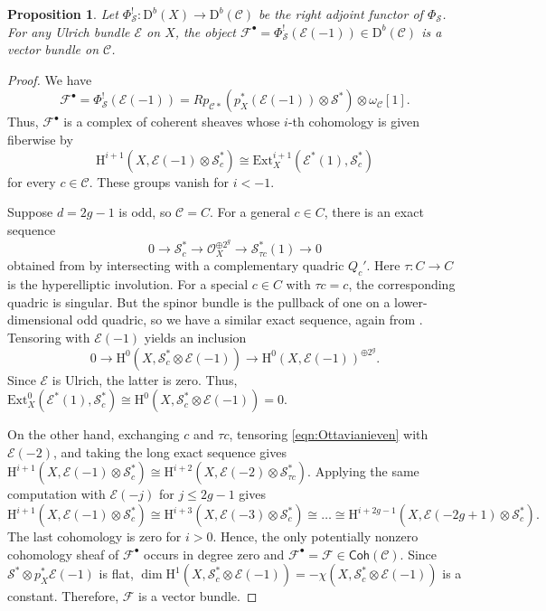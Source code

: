 \documentclass[12pt, letterpaper]{amsart}
\newtheorem{proposition}[theorem]{Proposition}
\theoremstyle{definition}
\newcommand{\cC}{\mathcal{C} }
\newcommand{\cE}{\mathcal{E} }
\newcommand{\cF}{\mathcal{F} }
\newcommand{\cO}{\mathcal{O} }
\newcommand{\cS}{\mathcal{S} }
\newcommand{\rD}{\mathrm{D} }
\newcommand{\rH}{\mathrm{H} }
\def\Ext{\mathrm{Ext} }
\newcommand{\Coh}{\mathsf{Coh}}
\begin{document}
\begin{proposition}\label{prop:FMofUlrichisvb}
Let \(\Phi_{\cS}^! : \rD^b(X) \to \rD^b(\cC)\) be the right adjoint functor of \(\Phi_{\cS}\). For any Ulrich bundle \(\cE\) on \(X\), the object \(\cF^\bullet = \Phi_{\cS}^!(\cE(-1))\in \rD^b(\cC)\) is a vector bundle on \(\cC\).
\end{proposition}

\begin{proof}
We have
\[\cF^\bullet = \Phi_{\cS}^!(\cE(-1)) = Rp_{\cC*}(p_X^*(\cE(-1)) \otimes \cS^*) \otimes \omega_\cC[1].\]
Thus, \(\cF^\bullet\) is a complex of coherent sheaves whose \(i\)-th cohomology is given fiberwise by
\[\rH^{i+1}(X, \cE(-1) \otimes \cS_{c}^*) \cong \Ext_X^{i+1}(\cE^*(1), \cS_{c}^*)\]
for every \(c \in \cC\). These groups vanish for \(i < -1\).

Suppose \(d = 2g - 1\) is odd, so \(\cC = C\). For a general \(c \in C\), there is an exact sequence
\begin{equation}\label{eqn:Ottavianieven}
0 \to \cS_{c}^* \to \cO_{X}^{\oplus 2^g} \to \cS_{\tau c}^*(1) \to 0
\end{equation}
obtained from \cite[Theorem~2.8]{Ott88} by intersecting with a complementary quadric \(Q_c'\). Here \(\tau : C \to C\) is the hyperelliptic involution. For a special \(c \in C\) with \(\tau c = c\), the corresponding quadric is singular. But the spinor bundle is the pullback of one on a lower-dimensional odd quadric, so we have a similar exact sequence, again from \cite[Theorem~2.8]{Ott88}. Tensoring with \(\cE(-1)\) yields an inclusion
\[0 \to \rH^0(X, \cS_c^* \otimes \cE(-1)) \to \rH^0(X, \cE(-1))^{\oplus 2^g}.\]
Since \(\cE\) is Ulrich, the latter is zero. Thus, \(\Ext_X^0(\cE^*(1), \cS_c^*) \cong \rH^0(X, \cS_c^* \otimes \cE(-1)) = 0\).

On the other hand, exchanging \(c\) and \(\tau c\), tensoring \eqref{eqn:Ottavianieven} with \(\cE(-2)\), and taking the long exact sequence gives \(\rH^{i+1}(X, \cE(-1) \otimes \cS_{c}^*) \cong \rH^{i+2} (X, \cE(-2) \otimes \cS_{\tau c}^*)\). Applying the same computation with \(\cE(-j)\) for \(j \le 2g-1\) gives
\[\rH^{i+1}(X, \cE(-1) \otimes \cS_{c}^*) \cong \rH^{i+3}(X, \cE(-3) \otimes \cS_{c}^*) \cong \dots \cong \rH^{i+2g-1}(X, \cE(-2g+1) \otimes \cS_{c}^*).\]
The last cohomology is zero for \(i > 0\). Hence, the only potentially nonzero cohomology sheaf of \(\cF^\bullet\) occurs in degree zero and \(\cF^\bullet = \cF\in \Coh(\cC)\). Since \(\cS^* \otimes p_X^*\cE(-1)\) is flat, \(\dim \rH^1(X, \cS_{c}^* \otimes \cE(-1)) = -\chi(X, \cS_{c}^* \otimes \cE(-1))\) is a constant. Therefore, \(\cF\) is a vector bundle.


\end{proof}
\end{document}
